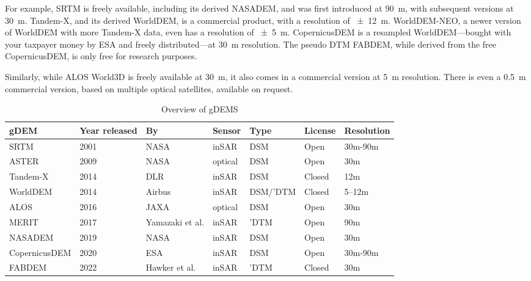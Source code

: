 For example, SRTM is freely available, including its derived NASADEM, and was first introduced at \qty{90}{m}, with subsequent versions at \qty{30}{m}.
Tandem-X, and its derived WorldDEM, is a commercial product, with a resolution of \qty{\pm12}{m}.
WorldDEM-NEO, a newer version of WorldDEM with more Tandem-X data, even has a resolution of \qty{\pm5}{m}.
CopernicusDEM is a resampled WorldDEM---bought with your taxpayer money by ESA and freely distributed---at \qty{30}{m} resolution.
The pseudo DTM FABDEM, while derived from the free CopernicusDEM, is only free for research purposes.

Similarly, while ALOS World3D is freely available at \qty{30}{m}, it also comes in a commercial version at \qty{5}{m} resolution.
There is even a \qty{0.5}{m} commercial version, based on multiple optical satellites, available on request.




\begin{table}[]
  \begin{tabular}{@{}l|llllll@{}}
    \toprule
    gDEM          & Year released & By              & Sensor  & Type     & License & Resolution \\
    \midrule
    SRTM          & 2001          & NASA            & inSAR   & DSM      & Open    & 30m-90m    \\
    ASTER         & 2009          & NASA            & optical & DSM      & Open    & 30m        \\
    Tandem-X      & 2014          & DLR             & inSAR   & DSM      & Closed  & 12m        \\
    WorldDEM      & 2014          & Airbus          & inSAR   & DSM/'DTM & Closed  & 5--12m      \\
    ALOS          & 2016          & JAXA            & optical & DSM      & Open    & 30m        \\
    MERIT         & 2017          & Yamazaki et al. & inSAR   & 'DTM     & Open    & 90m        \\
    NASADEM       & 2019          & NASA            & inSAR   & DSM      & Open    & 30m        \\
    CopernicusDEM & 2020          & ESA             & inSAR   & DSM      & Open    & 30m-90m    \\
    FABDEM        & 2022          & Hawker et al.   & inSAR   & 'DTM     & Closed  & 30m        \\
    \bottomrule
  \end{tabular}
  \caption{Overview of gDEMS}%
\label{tab:gdem_overview}
\end{table}

